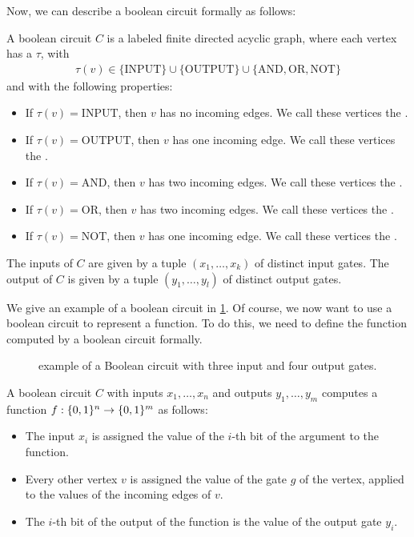 Now, we can describe a boolean circuit formally as follows:
\begin{definition}
    A boolean circuit $C$ is a labeled finite directed acyclic graph, where each vertex has a  $\tau$, with
    \begin{align*}
        \tau(v) \in \{\text{INPUT}\} \cup \{\text{OUTPUT}\} \cup \{\text{AND}, \text{OR}, \text{NOT}\}
    \end{align*}
    and with the following properties:
    \begin{itemize}
        \item If $\tau(v) = \text{INPUT}$, then $v$ has no incoming edges. We call these vertices the .
        \item If $\tau(v) = \text{OUTPUT}$, then $v$ has one incoming edge. We call these vertices the .
        \item If $\tau(v) = \text{AND}$, then $v$ has two incoming edges. We call these vertices the .
        \item If $\tau(v) = \text{OR}$, then $v$ has two incoming edges. We call these vertices the .
        \item If $\tau(v) = \text{NOT}$, then $v$ has one incoming edge. We call these vertices the .
    \end{itemize}
    The inputs of $C$ are given by a tuple $(x_1, \dots, x_k)$ of distinct input gates. The output of $C$ is given by a tuple $(y_1, \dots, y_l)$ of distinct output gates.
\end{definition}

We give an example of a boolean circuit in \cref{fig:boolean_circuit_example}. Of course, we now want to use a boolean circuit to represent a function. To do this, we need to define the function computed by a boolean circuit formally.

\begin{figure}
    \centering
    \caption[Example of a Boolean Circuit]{example of a Boolean circuit with three input and four output gates.}
    \label{fig:boolean_circuit_example}
\end{figure}

\begin{definition}
    A boolean circuit $C$ with inputs $x_1, \dots, x_n$ and outputs $y_1, \dots, y_m$ computes a function $f : \{0, 1\}^n \rightarrow \{0, 1\}^m$ as follows:
    \begin{itemize}
        \item The input $x_i$ is assigned the value of the $i$-th bit of the argument to the function.
        \item Every other vertex $v$ is assigned the value of the gate $g$ of the vertex, applied to the values of the incoming edges of $v$.
        \item The $i$-th bit of the output of the function is the value of the output gate $y_i$.
    \end{itemize}
\end{definition}

